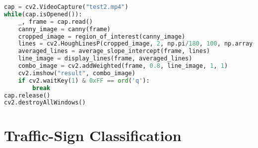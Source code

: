 \begin{lstlisting}[language=Python]
cap = cv2.VideoCapture("test2.mp4")
while(cap.isOpened()):
	_, frame = cap.read()
	canny_image = canny(frame)
	cropped_image = region_of_interest(canny_image)
	lines = cv2.HoughLinesP(cropped_image, 2, np.pi/180, 100, np.array([]), minLineLength=40, maxLineGap=5)
	averaged_lines = average_slope_intercept(frame, lines)
	line_image = display_lines(frame, averaged_lines)
	combo_image = cv2.addWeighted(frame, 0.8, line_image, 1, 1)
	cv2.imshow("result", combo_image)
	if cv2.waitKey(1) & 0xFF == ord('q'):
		break
cap.release()
cv2.destroyAllWindows()

\end{lstlisting}


\section{Traffic-Sign Classification}

